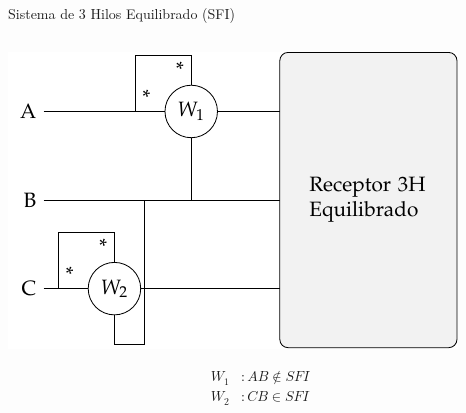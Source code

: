 \documentclass[aspectratio=169, usenames,svgnames,dvipsnames]{beamer}
\begin{document}
\begin{frame}[label={sec:org9d0dd9c},plain]{Sistema de 3 Hilos Equilibrado (SFI)}
\begin{columns}
\begin{column}{0.33\columnwidth}
\begin{center}
\includegraphics[width=.9\linewidth]{../figs/Potencia3H_Equilibrado_CA_SFI.pdf}
\end{center}
\begin{align*}
  W_1&: AB \notin SFI\\
  W_2&: CB \in SFI\\
\end{align*}
\end{column}
\end{columns}
\end{frame}
\end{document}
